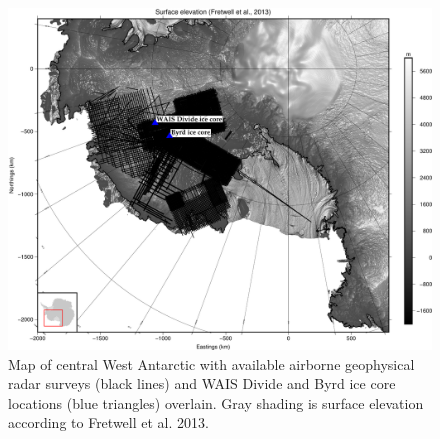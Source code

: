 \documentclass[12pt]{article}
\begin{document}






\begin{figure}[!h]
\centering
\includegraphics[scale=0.6]{figures/WAISall_dem_flat_pst_cores}
\caption[]{Map of central West Antarctic with available airborne geophysical radar surveys (black lines) and WAIS Divide and Byrd ice core locations (blue triangles) overlain. Gray shading is surface elevation according to Fretwell et al. 2013. }
\label{fig:radarmap}
\end{figure}
\end{document}
